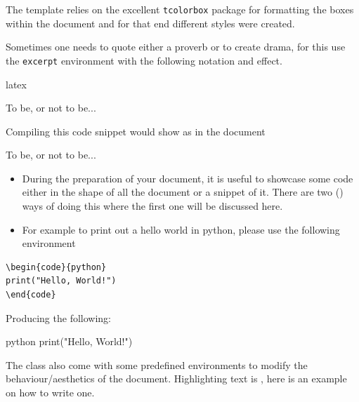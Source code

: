 \documentclass[minted, draw]{../tex/hebdomon}
\begin{document}
%
%

%
%
\begin{hgitemize}
	\item[\pcode{excerpt}] The template relies on the excellent \lstinline[columns=fixed]{tcolorbox}
	package for formatting the boxes within the document and for that end different styles were created.
	\item[] Sometimes one needs to quote either a proverb or to create drama, for this use
	the \lstinline[columns=fixed]{excerpt} environment with the following notation and effect.
\end{hgitemize}
%
\begin{code}{latex}
\begin{excerpt}
  To be, or not to be...
\end{excerpt}
\end{code}
%
\begin{hgitemize}
	\item[] Compiling this code snippet would show as in the document
\end{hgitemize}
%
\begin{excerpt}
	To be, or not to be...
\end{excerpt}
%
\begin{itemize}[leftmargin=!,labelindent=-29.2pt]
	\item[\pcode{code}] During the preparation of your document, it is useful to showcase
	      some code either in the shape of all the document or a snippet of it.
	      There are two () ways of doing this where the first one will be discussed here.
	\item[] For example to print out a hello world in python, please use the following environment
\end{itemize}
%
\begin{verbatim}
\begin{code}{python}
print("Hello, World!")
\end{code}
\end{verbatim}
%
Producing the following:
%
\begin{code}{python}
print("Hello, World!")
\end{code}
%
The class also come with some predefined environments to modify the behaviour/aesthetics of the document.
%
Highlighting text is , here is an example on how to write one.
\end{document}
